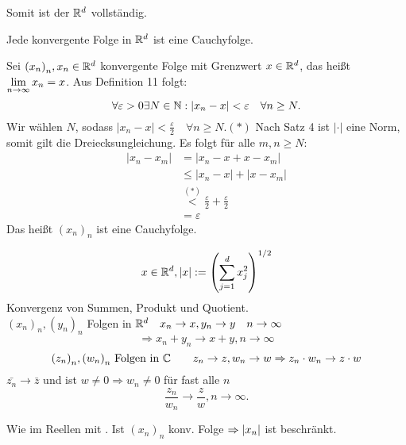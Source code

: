\documentclass[../ana1.tex]{subfiles}
\begin{document}
Somit ist der \(\mathbb{R}^d\) vollständig.
\begin{lem}
	Jede konvergente Folge in \(\mathbb{R}^d\) ist eine Cauchyfolge.
\end{lem}
\begin{bew}
	Sei \({(x_n)}_n, x_n\in\mathbb{R}^d\) konvergente Folge mit Grenzwert \(x\in\mathbb{R}^d\), das heißt \(\lim\limits_{n\rightarrow\infty} x_n = x\). Aus Definition 11 folgt:
	\[\forall \varepsilon>0 \exists N\in\mathbb{N}: |x_n - x| < \varepsilon \quad\forall n\geq N.\]
	Wir wählen \(N\), sodass \(|x_n - x| < \frac{\varepsilon}{2} \quad\forall n\geq N. (*)\)
	Nach Satz 4 ist \(|\cdot|\) eine Norm, somit gilt die Dreiecksungleichung. Es folgt für alle \(m,n\geq N\):
	\begin{align*}
		|x_n - x_m| &= |x_n - x + x - x_m|\\
		&\leq |x_n - x| + |x  - x_m|\\
		&\overset{(*)}{<} \frac{\varepsilon}{2} + \frac{\varepsilon}{2}\\
		&= \varepsilon
	\end{align*}
	Das heißt \({(x_n)}_n\) ist eine Cauchyfolge.
\end{bew}

\[ x\in\mathbb{R}^d, \left|x\right| := {\left( \sum_{j=1}^d x_j^2 \right)}^{1/2} \]
Konvergenz von Summen, Produkt und Quotient.\\
\( {(x_n)}_n, {(y_n)}_n \) Folgen in \( \mathbb{R}^d \quad x_n \rightarrow x, y_n \rightarrow y \quad n\rightarrow\infty \)
\[ \Rightarrow x_n + y_n \rightarrow x + y, n\rightarrow\infty \]
\[ {(z_n)}_n, {(w_n)}_n \text{ Folgen in } \mathbb{C} \qquad z_n \rightarrow z, w_n \rightarrow w \Rightarrow z_n \cdot w_n \rightarrow z \cdot w\]
\(\bar{z_n} \rightarrow \bar{z} \) und ist \( w\neq 0 \Rightarrow w_n \neq 0 \) für fast alle \(n\)
\[ \frac{z_n}{w_n} \rightarrow \frac{z}{w}, n\rightarrow\infty. \]
\begin{bew}
	Wie im Reellen mit . Ist \( {(x_n)}_n \) konv. Folge \( \Rightarrow \left|x_n\right| \) ist beschränkt.
\end{bew}
\end{document}
